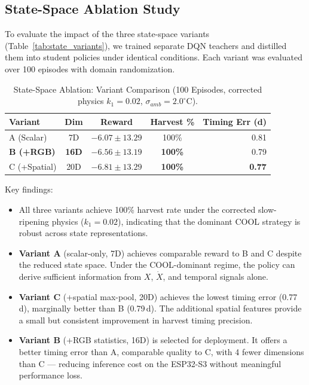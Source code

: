 \subsection{State-Space Ablation Study}
\label{subsec:ablation}

To evaluate the impact of the three state-space variants (Table~\ref{tab:state_variants}), we trained separate DQN teachers and distilled them into student policies under identical conditions. Each variant was evaluated over 100 episodes with domain randomization.

\begin{table}[htbp]
\caption{State-Space Ablation: Variant Comparison (100 Episodes, corrected physics $k_1=0.02$, $\sigma_{amb}=2.0^\circ$C).}
\label{tab:ablation_results}
\centering
\begin{tabular}{@{}lcccr@{}}
\toprule
\textbf{Variant} & \textbf{Dim} & \textbf{Reward} & \textbf{Harvest \%} & \textbf{Timing Err (d)} \\
\midrule
A (Scalar) & 7D & $-6.07 \pm 13.29$ & 100\% & 0.81 \\
\textbf{B (+RGB)} & \textbf{16D} & $-6.56 \pm 13.19$ & \textbf{100\%} & 0.79 \\
C (+Spatial) & 20D & $-6.81 \pm 13.29$ & \textbf{100\%} & \textbf{0.77} \\
\bottomrule
\end{tabular}
\end{table}

Key findings:
\begin{itemize}
    \item All three variants achieve 100\% harvest rate under the corrected slow-ripening physics ($k_1=0.02$), indicating that the dominant COOL strategy is robust across state representations.
    \item \textbf{Variant A} (scalar-only, 7D) achieves comparable reward to B and C despite the reduced state space. Under the COOL-dominant regime, the policy can derive sufficient information from $X$, $\dot{X}$, and temporal signals alone.
    \item \textbf{Variant C} (+spatial max-pool, 20D) achieves the lowest timing error (0.77\,d), marginally better than B (0.79\,d). The additional spatial features provide a small but consistent improvement in harvest timing precision.
    \item \textbf{Variant B} (+RGB statistics, 16D) is selected for deployment. It offers a better timing error than A, comparable quality to C, with 4 fewer dimensions than C --- reducing inference cost on the ESP32-S3 without meaningful performance loss.
\end{itemize}

